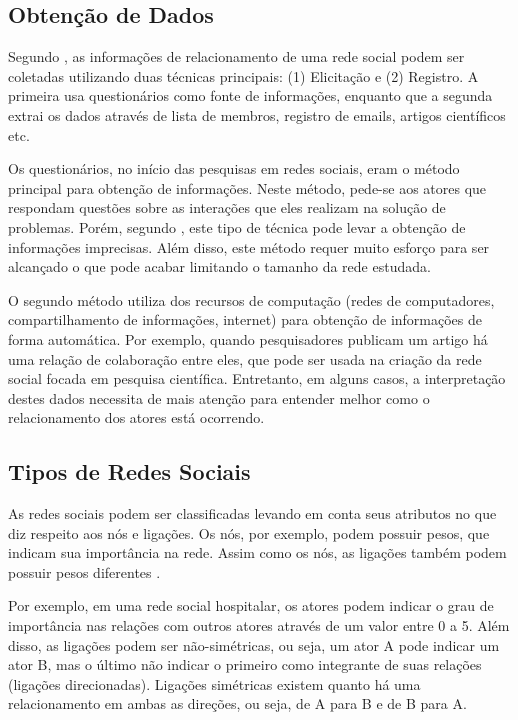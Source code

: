 \subsection{Obtenção de Dados}
Segundo , as informações de relacionamento de uma rede social podem ser coletadas utilizando duas técnicas principais: (1) Elicitação e (2) Registro. A primeira usa questionários como fonte de informações, enquanto que a segunda extrai os dados através de lista de membros, registro de emails, artigos científicos etc.

Os questionários, no início das pesquisas em redes sociais, eram o método principal para obtenção de informações. Neste método, pede-se aos atores que respondam questões sobre as interações que eles realizam na solução de problemas. Porém, segundo , este tipo de técnica pode levar a obtenção de informações imprecisas. Além disso, este método requer muito esforço para ser alcançado o que pode acabar limitando o tamanho da rede estudada. 

O segundo método utiliza dos recursos de computação (redes de computadores, compartilhamento de informações, internet) para obtenção de informações de forma automática. Por exemplo, quando pesquisadores publicam um artigo há uma relação de colaboração entre eles, que pode ser usada na criação da rede social focada em pesquisa científica. Entretanto, em alguns casos, a interpretação destes dados necessita de mais atenção para entender melhor como o relacionamento dos atores está ocorrendo.

\subsection{Tipos de Redes Sociais}
As redes sociais podem ser classificadas levando em conta seus atributos no que diz respeito aos nós e ligações. Os nós, por exemplo, podem possuir pesos, que indicam sua importância na rede. Assim como os nós, as ligações também podem possuir pesos diferentes \cite{pan2007effective}. 

Por exemplo, em uma rede social hospitalar, os atores podem indicar o grau de importância nas relações com outros atores através de um valor entre 0 a 5. Além disso, as ligações podem ser não-simétricas, ou seja, um ator A pode indicar um ator B, mas o último não indicar o primeiro como integrante de suas relações (ligações direcionadas). Ligações simétricas existem quanto há uma relacionamento em ambas as direções, ou seja, de A para B e de B para A.

